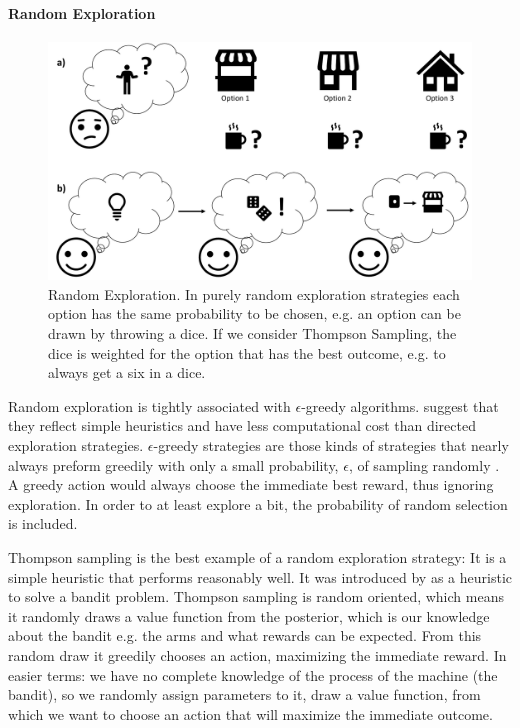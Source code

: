 \paragraph{Random Exploration}
\begin{figure}
    \centering
    \includegraphics[width=1\textwidth]{Plots/RandomExploration.pdf}
    \caption[Random Exploration]{Random Exploration. In purely random exploration strategies each option has the same probability to be chosen, e.g. an option can be drawn by throwing a dice. If we consider Thompson Sampling, the dice is weighted for the option that has the best outcome, e.g. to always get a six in a dice.}
    \label{fig:RandomExploration}
\end{figure}

Random exploration is tightly associated with $\epsilon$-greedy algorithms. \cite{wilson2014humans} suggest that they reflect simple heuristics and have less computational cost than directed exploration strategies.  
$\epsilon$-greedy strategies are those kinds of strategies that nearly always preform greedily with only a small probability, $\epsilon$, of sampling randomly \citep[pp.27-28]{sutton2018reinforcement}. A greedy action would always choose the immediate best reward, thus ignoring exploration. In order to at least explore a bit, the probability of random selection is included. 

Thompson sampling is the best example of a random exploration strategy: It is a simple heuristic that performs reasonably well.
It was introduced by \cite{thompson1933likelihood} as a heuristic to solve a bandit problem.
Thompson sampling is random oriented, which means it randomly draws a value function from the posterior, which is our knowledge about the bandit e.g. the arms and what rewards can be expected. From this random draw it greedily chooses an action, maximizing the immediate reward. In easier terms: we have no complete knowledge of the process of the machine (the bandit), so we randomly assign parameters to it, draw a value function, from which we want to choose an action that will maximize the immediate outcome.

